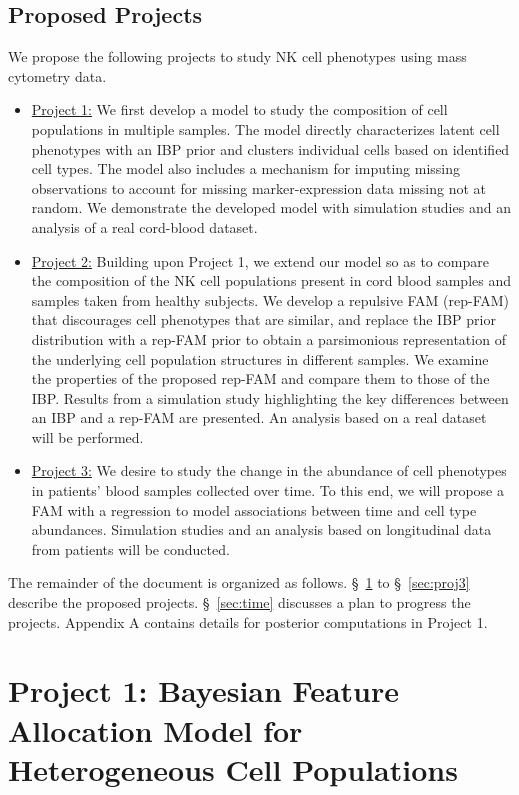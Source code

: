 \documentclass[12pt,]{article}
\begin{document}
\subsection{Proposed Projects}
We propose the following projects to study NK cell phenotypes using mass
cytometry data. 
\begin{itemize}
\item \underline{Project 1:}
We first develop a model to study the composition of cell populations in
multiple samples.  The model directly characterizes latent cell phenotypes with
an IBP prior and clusters individual cells based on identified cell types.  The
model also includes a mechanism for imputing missing observations to account
for missing marker-expression data missing not at random. We demonstrate the
developed model with simulation studies and an analysis of a real cord-blood
dataset.

\item \underline{Project 2:}
Building upon Project 1, we extend our model so as to compare the composition
of the NK cell populations present in cord blood samples and samples taken from
healthy subjects.  We develop a repulsive FAM (rep-FAM) that discourages cell
phenotypes that are similar, and replace the IBP prior distribution with a
rep-FAM prior to obtain a parsimonious representation of the underlying cell
population structures in different samples. We examine the properties of the
proposed rep-FAM and compare them to those of the IBP.  Results from a
simulation study highlighting the key differences between an IBP and a rep-FAM
are presented. An analysis based on a real dataset will be performed.

\item \underline{Project 3:}
We desire to study the change in the abundance of cell phenotypes in patients'
blood samples collected over time. To this end, we will propose a FAM with a
regression to model associations between time and cell type abundances.
Simulation studies and an analysis based on longitudinal data from patients
will be conducted.

\end{itemize} 
The remainder of the document is organized as follows.
\S~\ref{sec:proj1} to \S~\ref{sec:proj3} describe the proposed projects.
\S~\ref{sec:time} discusses a plan to progress the projects.  
Appendix A contains details for posterior computations in Project 1.



\section{Project 1: Bayesian Feature Allocation Model for Heterogeneous Cell Populations}\label{sec:proj1}
\end{document}
